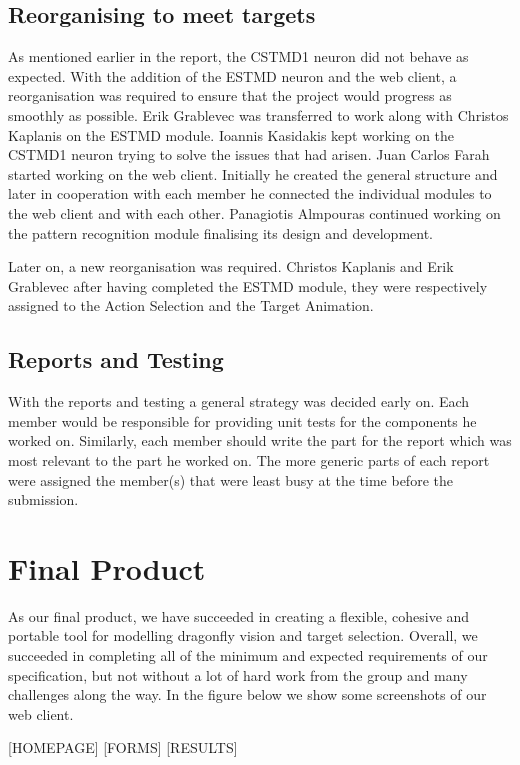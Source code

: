 \documentclass[a4paper,11pt]{article}
\begin{document}
\subsection{Reorganising to meet targets}
As mentioned earlier in the report, the CSTMD1 neuron did not behave as expected. With the addition of the ESTMD neuron and the web client, a reorganisation was required to ensure that the project would progress as smoothly as possible. Erik Grablevec was transferred to work along with Christos Kaplanis on the ESTMD module. Ioannis Kasidakis kept working on the CSTMD1 neuron trying to solve the issues that had arisen. Juan Carlos Farah started working on the web client. Initially he created the general structure and later in cooperation with each member he connected the individual modules to the web client and with each other. Panagiotis Almpouras continued working on the pattern recognition module finalising its design and development.

Later on, a new reorganisation was required. Christos Kaplanis  and Erik Grablevec after having completed the ESTMD module, they were respectively assigned to the Action Selection and the Target Animation.

\subsection{Reports and Testing}
With the reports and testing a general strategy was decided early on. Each member would be responsible for providing unit tests for the components he worked on. Similarly, each member should write the part for the report which was most relevant to the part he worked on. The more generic parts of each report were assigned the member(s) that were least busy at the time before the submission.


\clearpage
\section{Final Product}

As our final product, we have succeeded in creating a flexible, cohesive and portable tool for modelling dragonfly vision and target selection. Overall, we succeeded in completing all of the minimum and expected requirements of our specification, but not without a lot of hard work from the group and many challenges along the way. In the figure below we show some screenshots of our web client.

[HOMEPAGE]
[FORMS]
[RESULTS]
\end{document}
